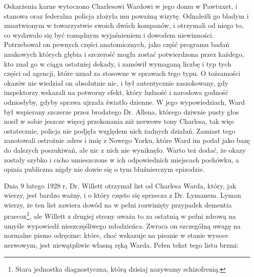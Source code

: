 Oskarżenia karne wytoczono Charlesowi Wardowi w jego domu w Pawtuxet, i stanowa oraz federalna policja złożyła mu poważną wizytę. Odnaleźli go bladym i zmartwionym w towarzystwie swoich dwóch kompanów, i otrzymali od niego to, co wydawało się być rozsądnym wyjaśnieniem i dowodem niewinności. Potrzebował on pewnych części anatomicznych, jako część programu badań naukowych których głębia i szczerość mogła zostać potwierdzona przez każdego, kto znał go w ciągu ostatniej dekady, i zamówił wymaganą liczbę i typ tych części od agencji, które uznał za stosowne w sprawach tego typu. O tożsamości okazów nie wiedział on absolutnie nic, i był autentycznie zaszokowany, gdy inspektorzy wskazali na potworny efekt, który ludność i narodowa godność odniosłyby, gdyby sprawa ujrzała światło dzienne. W jego wypowiedziach, Ward był wspierany szczerze przez brodatego Dr. Allena, którego dziwnie pusty głos nosił w sobie jeszcze więcej przekonania niż nerwowe tony Charlesa, tak więc ostatecznie, policja nie podjęła względem nich żadnych działań. Zamiast tego zanotowali ostrożnie adres i imię z Nowego Yorku, które Ward im podał jako bazę do dalszych poszukiwań, ale nic z nich nie wyniknęło.  Warto też dodać, że okazy zostały szybko i cicho umieszczone w ich odpowiednich miejscach pochówku, a opinia publiczna nigdy nie dowie się o tym bluźnierczym epizodzie. 

Dnia 9 lutego 1928 r, Dr. Willett otrzymał list od Charlesa Warda, który, jak wierzy, jest bardzo ważny, i o który często się sprzecza z Dr. Lymanem. Lyman wierzy, że ten list zawiera dowód na w pełni rozwinięty przypadek dementia praecox\footnote{Stara jednostka diagnostyczna, którą dzisiaj nazywamy schizofrenią.}, ale Willett z drugiej strony uważa to za ostatnią w pełni zdrową na umyśle wypowiedź nieszczęśliwego młodzieńca. Zwraca on szczególną uwagę na normalne pismo odręczne: które, choć wskazuje na pisanie w stanie wysoce nerwowym, jest niewątpliwie własną ręką Warda. Pełen tekst tego listu brzmi:

